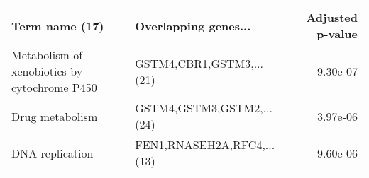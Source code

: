 \begin{tabular}{llr}
\toprule
                              Term name (17) &       Overlapping genes... &  Adjusted p-value \\
\midrule
Metabolism of xenobiotics by cytochrome P450 &   GSTM4,CBR1,GSTM3,...(21) &          9.30e-07 \\
                             Drug metabolism &  GSTM4,GSTM3,GSTM2,...(24) &          3.97e-06 \\
                             DNA replication & FEN1,RNASEH2A,RFC4,...(13) &          9.60e-06 \\
\bottomrule
\end{tabular}
